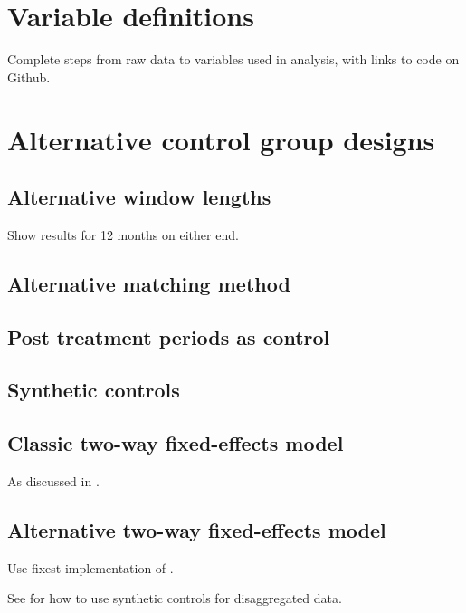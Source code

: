 \documentclass[a4paper, 11pt]{article}
\begin{document}
\section{Variable definitions}%
\label{sec:variable_definitions}

Complete steps from raw data to variables used in analysis, with links to code
on Github.


\section{Alternative control group designs}%
\label{sec:alternative_control_group_designs}

\subsection{Alternative window lengths}%
\label{sub:alternative_window_lengths}

Show results for 12 months on either end.

\subsection{Alternative matching method}%
\label{sub:alternative_matching_method}

\subsection{Post treatment periods as control}%
\label{sub:post_treatment_periods_as_control}

\subsection{Synthetic controls}%
\label{sub:synthetic_controls}

\subsection{Classic two-way fixed-effects model}%
\label{sub:classic_two_way_fixed_effects_model}

As discussed in \citet{imai2021matching}.

\subsection{Alternative two-way fixed-effects model}%
\label{sub:alternative_two_way_fixed_effects_model}

Use fixest implementation of \citet{sun2021estimating}.





See \citet{abadie2021penalized} for how to use synthetic controls for
disaggregated data.
\end{document}
